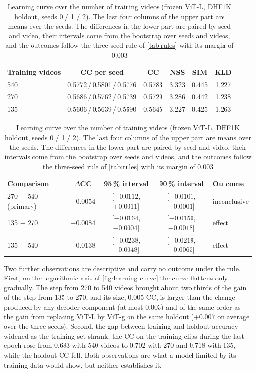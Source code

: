\begin{table}[htbp]
  \centering
  \caption{Learning curve over the number of training videos (frozen
  \acrshort{ViT}-L, DHF1K holdout, seeds 0 / 1 / 2). The last four columns of the
  upper part are means over the seeds. The differences in the lower part are
  paired by seed and video, their intervals come from the bootstrap over seeds
  and videos, and the outcomes follow the three-seed rule of \cref{tab:rules}
  with its margin of 0.003}\label{tab:learning-curve}
  \footnotesize
  \setlength{\tabcolsep}{5pt}
  \begin{tabular}{@{}lccccc@{}}
    \toprule
    \textbf{Training videos} & \textbf{\acrshort{CC} per seed} & \textbf{\acrshort{CC}}
      & \textbf{\acrshort{NSS}} & \textbf{\acrshort{SIM}} & \textbf{\acrshort{KLD}} \\
    \midrule
    540 & 0.5772\,/\,0.5801\,/\,0.5776 & 0.5783 & 3.323 & 0.445 & 1.227 \\
    270 & 0.5686\,/\,0.5762\,/\,0.5739 & 0.5729 & 3.286 & 0.442 & 1.238 \\
    135 & 0.5606\,/\,0.5639\,/\,0.5690 & 0.5645 & 3.227 & 0.425 & 1.263 \\
    \bottomrule
  \end{tabular}

  \vspace{8pt}
  \begin{tabular}{@{}lcccl@{}}
    \toprule
    \textbf{Comparison} & $\Delta$\textbf{\acrshort{CC}}
      & \textbf{95\,\% interval} & \textbf{90\,\% interval} & \textbf{Outcome} \\
    \midrule
    270 $-$ 540 (primary) & $-0.0054$
      & [$-0.0112$, $+0.0011$] & [$-0.0101$, $-0.0001$] & inconclusive \\
    135 $-$ 270 & $-0.0084$
      & [$-0.0164$, $-0.0004$] & [$-0.0150$, $-0.0018$] & effect \\
    135 $-$ 540 & $-0.0138$
      & [$-0.0238$, $-0.0048$] & [$-0.0219$, $-0.0063$] & effect \\
    \bottomrule
  \end{tabular}
\end{table}

Two further observations are descriptive and carry no outcome under the rule.
First, on the logarithmic axis of \cref{fig:learning-curve} the curve flattens
only gradually. The step from 270 to 540 videos brought about two thirds of
the gain of the step from 135 to 270, and its size, 0.005 \acrshort{CC}, is
larger than the change produced by any decoder component (at most 0.003) and
of the same order as the gain from replacing \acrshort{ViT}-L by
\acrshort{ViT}-g on the same holdout ($+0.007$ on average over the three
seeds). Second, the gap between training and holdout accuracy widened as the
training set shrank: the
\acrshort{CC} on the training clips during the last epoch rose from 0.683 with
540 videos to 0.702 with 270 and 0.718 with 135, while the holdout
\acrshort{CC} fell. Both observations are what a model limited by its training
data would show, but neither establishes it.

